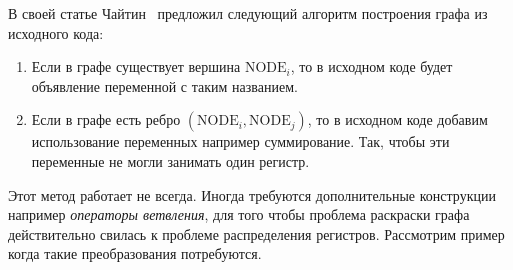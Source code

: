 
В своей статье Чайтин~\cite{chaitin1982} предложил следующий алгоритм построения графа из исходного кода:

\begin{enumerate}
    \item Если в графе существует вершина $\text{NODE}_i$, то в исходном коде будет объявление переменной с таким
    названием.
    \item Если в графе есть ребро $(\text{NODE}_i, \text{NODE}_j)$, то в исходном коде добавим использование переменных
    например суммирование. Так, чтобы эти переменные не могли занимать один регистр.
\end{enumerate}

Этот метод работает не всегда. Иногда требуются дополнительные конструкции например \textit{операторы ветвления},
для того чтобы проблема раскраски графа действительно свилась к проблеме распределения регистров. Рассмотрим пример когда такие
преобразования потребуются.


